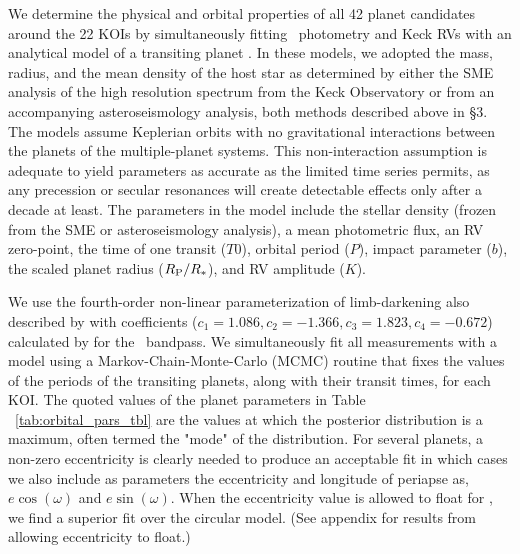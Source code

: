 \documentclass{emulateapj}
\begin{document}
We determine the physical and orbital properties of all 42 planet
 candidates around the 22 KOIs by simultaneously fitting
 \ek\ photometry and Keck RVs with an analytical model of a transiting
 planet \citep{Mandel2002}.  In these models, we adopted the mass,
 radius, and the mean density of the host star as determined by either
 the SME analysis of the high resolution spectrum from the Keck
 Observatory or from an accompanying asteroseismology analysis, both
 methods described above in \S 3.  The models assume Keplerian orbits
 with no gravitational interactions between the planets of the
 multiple-planet systems.  This non-interaction assumption is adequate
 to yield parameters as accurate as the limited time series permits,
 as any precession or secular resonances will create detectable
 effects only after a decade at least.  The parameters in the model
 include the stellar density (frozen from the SME or asteroseismology
 analysis), a mean photometric flux, an RV zero-point, the time of one
 transit ($T0$), orbital period ($P$), impact parameter ($b$), the
 scaled planet radius ($R_{\rm P}/R_*$), and RV amplitude ($K$).

We use the fourth-order non-linear parameterization of limb-darkening
 also described by \cite{Mandel2002} with coefficients ($c_1=1.086,
 c_2=-1.366, c_3=1.823, c_4=-0.672$) calculated by
 \cite{limbdarkening} for the \ek\ bandpass.  We simultaneously fit
 all measurements with a model using a Markov-Chain-Monte-Carlo (MCMC)
 routine that fixes the values of the periods of the transiting
 planets, along with their transit times, for each KOI.  The quoted
 values of the planet parameters in Table ~\ref{tab:orbital_pars_tbl} 
 are the values at which
 the posterior distribution is a maximum, often termed the "mode" of
 the distribution.  For several planets, a non-zero eccentricity is
 clearly needed to produce an acceptable fit in which cases we also
 include as parameters the eccentricity and longitude of periapse as,
 $e\cos(\omega)$ and $e\sin(\omega)$.  When the eccentricity value is
 allowed to float for {\koionezerofour}, we find a superior fit over the
 circular model.  (See appendix for results from allowing eccentricity to float.)
\end{document}
